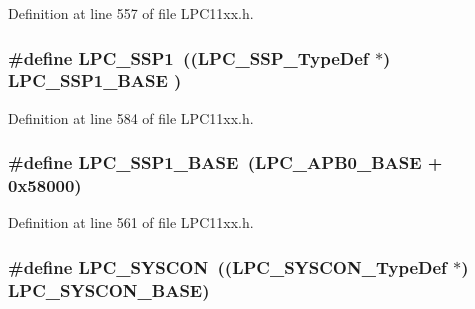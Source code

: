 Definition at line 557 of file L\+P\+C11xx.\+h.

\subsubsection[{\texorpdfstring{L\+P\+C\+\_\+\+S\+S\+P1}{LPC_SSP1}}]{\setlength{\rightskip}{0pt plus 5cm}\#define L\+P\+C\+\_\+\+S\+S\+P1~(({\bf L\+P\+C\+\_\+\+S\+S\+P\+\_\+\+Type\+Def}    $\ast$) {\bf L\+P\+C\+\_\+\+S\+S\+P1\+\_\+\+B\+A\+SE}  )}\hypertarget{group___l_p_c11xx___definitions_ga09c4610ada1d9aa18913963cbd1a6e52}{}\label{group___l_p_c11xx___definitions_ga09c4610ada1d9aa18913963cbd1a6e52}


Definition at line 584 of file L\+P\+C11xx.\+h.

\subsubsection[{\texorpdfstring{L\+P\+C\+\_\+\+S\+S\+P1\+\_\+\+B\+A\+SE}{LPC_SSP1_BASE}}]{\setlength{\rightskip}{0pt plus 5cm}\#define L\+P\+C\+\_\+\+S\+S\+P1\+\_\+\+B\+A\+SE~({\bf L\+P\+C\+\_\+\+A\+P\+B0\+\_\+\+B\+A\+SE} + 0x58000)}\hypertarget{group___l_p_c11xx___definitions_ga05d118997f53f596d3a087f8b91a1969}{}\label{group___l_p_c11xx___definitions_ga05d118997f53f596d3a087f8b91a1969}


Definition at line 561 of file L\+P\+C11xx.\+h.

\subsubsection[{\texorpdfstring{L\+P\+C\+\_\+\+S\+Y\+S\+C\+ON}{LPC_SYSCON}}]{\setlength{\rightskip}{0pt plus 5cm}\#define L\+P\+C\+\_\+\+S\+Y\+S\+C\+ON~(({\bf L\+P\+C\+\_\+\+S\+Y\+S\+C\+O\+N\+\_\+\+Type\+Def} $\ast$) {\bf L\+P\+C\+\_\+\+S\+Y\+S\+C\+O\+N\+\_\+\+B\+A\+SE})}\hypertarget{group___l_p_c11xx___definitions_gabe45c10a979fe812e3d9ecd72fe33a2f}{}\label{group___l_p_c11xx___definitions_gabe45c10a979fe812e3d9ecd72fe33a2f}


